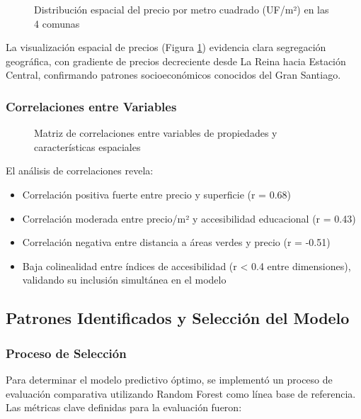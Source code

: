 \begin{figure}[H]
    \centering
    \caption{Distribución espacial del precio por metro cuadrado (UF/m²) en las 4 comunas}
    \label{fig:mapa_precios}
\end{figure}

La visualización espacial de precios (Figura \ref{fig:mapa_precios}) evidencia clara segregación geográfica, con gradiente de precios decreciente desde La Reina hacia Estación Central, confirmando patrones socioeconómicos conocidos del Gran Santiago.

\subsubsection{Correlaciones entre Variables}

\begin{figure}[H]
    \centering
    \caption{Matriz de correlaciones entre variables de propiedades y características espaciales}
    \label{fig:correlaciones}
\end{figure}

El análisis de correlaciones revela:

\begin{itemize}
    \item Correlación positiva fuerte entre precio y superficie (r = 0.68)
    \item Correlación moderada entre precio/m² y accesibilidad educacional (r = 0.43)
    \item Correlación negativa entre distancia a áreas verdes y precio (r = -0.51)
    \item Baja colinealidad entre índices de accesibilidad (r < 0.4 entre dimensiones), validando su inclusión simultánea en el modelo
\end{itemize}

\subsection{Patrones Identificados y Selección del Modelo}

\subsubsection{Proceso de Selección}

Para determinar el modelo predictivo óptimo, se implementó un proceso de evaluación comparativa utilizando Random Forest como línea base de referencia. Las métricas clave definidas para la evaluación fueron:

